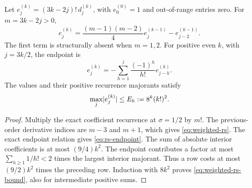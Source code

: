 \begin{lemma}\label{lem:weighted-rs}
Let \(e_j^{(k)}=(3k-2j)!\,d_j^{(k)}\), with \(e_0^{(0)}=1\)
and out-of-range entries zero. For \(m=3k-2j>0\),
\begin{equation}
 e_j^{(k)}
 =\frac{(m-1)(m-2)}4e_j^{(k-1)}-e_{j-2}^{(k-1)}.
 \label{eq:weighted-rs}
\end{equation}
The first term is structurally absent when \(m=1,2\).
For positive even \(k\), with \(j=3k/2\), the endpoint is
\begin{equation}
 e_j^{(k)}=-\sum_{h=1}^{j}\frac{(-1)^h}{h!}e_{j-h}^{(k)}.
 \label{eq:rs-endpoint}
\end{equation}
The values and their positive recurrence majorants satisfy
\begin{equation}
 \max_j\lvert e_j^{(k)}\rvert\le E_k:=8^k(k!)^2.
 \label{eq:weighted-rs-bound}
\end{equation}
\end{lemma}
\begin{proof}
Multiply the exact coefficient recurrence at \(\sigma=1/2\)
by \(m!\). The previous-order derivative indices are \(m-3\)
and \(m+1\), which gives \eqref{eq:weighted-rs}.
The exact endpoint relation gives \eqref{eq:rs-endpoint}.
The sum of absolute interior coefficients is at most
\((9/4)k^2\). The endpoint contributes a factor at most
\(\sum_{h\ge1}1/h!<2\) times the largest interior majorant.
Thus a row costs at most \((9/2)k^2\) times the preceding row.
Induction with \(8k^2\) proves \eqref{eq:weighted-rs-bound},
also for intermediate positive sums.
\end{proof}

